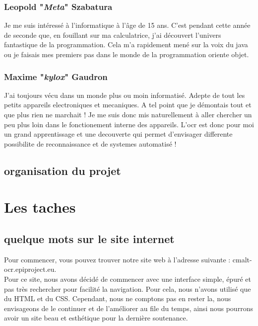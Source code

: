 \documentclass{article}
\begin{document}
\subsubsection{Leopold "\textit{Meta}" Szabatura}
Je me suis intéressé à l'informatique à l’âge de 15 ans.
C'est pendant cette année de seconde que, en fouillant sur ma calculatrice, j'ai découvert l'univers fantastique de la programmation.
Cela m'a rapidement mené sur la voix du java ou je faisais mes premiers pas dans le monde de la programmation oriente objet.
\subsubsection{Maxime "\textit{kylox}" Gaudron}
J'ai toujours vécu dans un monde plus ou moin informatisé. Adepte de tout les petits appareils electroniques et mecaniques. A tel point que je démontais tout et que plus rien ne marchait ! Je me suis donc mis naturellement à aller chercher un peu plus loin dans le fonctionement interne des appareils. L'ocr est donc pour moi un grand apprentissage et une decouverte qui permet d'envisager differente possibilite de reconnaissance et de systemes automatisé ! 
\subsection{organisation du projet}
\newpage
\section{Les taches}
\subsection{quelque mots sur le site internet}
Pour commencer, vous pouvez trouver notre site web à l'adresse suivante : cmalt-ocr.epiproject.eu.\\
Pour ce site, nous avons décidé de commencer avec une interface simple, épuré et pas très rechercher pour facilité la navigation. Pour cela, nous n'avons utilisé que du HTML et du CSS. Cependant, nous ne comptons pas en rester la, nous envisageons de le continuer et de l'améliorer au file du temps, ainsi nous pourrons avoir un site beau et esthétique pour la dernière soutenance.\\ 
\end{document}
